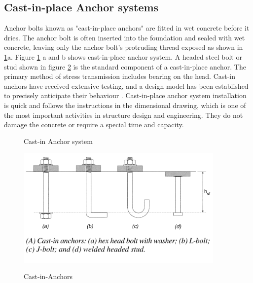 {\subsection{Cast-in-place Anchor systems}
Anchor bolts known as "cast-in-place anchors" are fitted in wet concrete before it dries. The anchor bolt is often inserted into the foundation and sealed with wet concrete, leaving only the anchor bolt's protruding thread exposed as shown in \ref{fig:3.18}a. Figure \ref{fig:3.18} a and b shows cast-in-place anchor system. A headed steel bolt or stud shown in figure \ref{fig:3.19} is the standard component of a cast-in-place anchor. The primary method of stress transmission includes bearing on the head. Cast-in anchors have received extensive testing, and a design model has been established to precisely anticipate their behaviour \cite{cook2003design}. Cast-in-place anchor system installation is quick and follows the instructions in the dimensional drawing, which is one of the most important activities in structure design and engineering. They do not damage the concrete or require a special time and capacity.

\begin{figure}%
    \centering
     \cite{cook1989design}
    \qquad
    \caption{Cast-in Anchor system }
    \label{fig:3.18}
\end{figure}

\begin{figure}[htp]
    \centering
    \includegraphics[width=4in]{Figures/Cast-in-anchors-1024x593.png}
    \caption{Cast-in-Anchors}
    \cite{carrato2008applying}
    \label{fig:3.19}
\end{figure}



}
